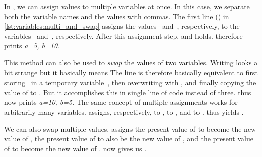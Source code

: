 %
%
%
%
In \python, we can assign values to multiple variables at once.
In this case, we separate both the variable names and the values with commas.
The first line (\pythonIdx{,}) in \cref{lst:variables:multi_and_swap} assigns the values~ and~, respectively, to the variables~ and~, respectively.
After this assignment step,  and  holds.
 therefore prints \textit{a=5, b=10}.

This method can also be used to \emph{swap} the values of two variables.
Writing  looks a bit strange but it basically means 
The line is therefore basically equivalent to first storing~ in a temporary variable~, then overwriting  with , and finally copying the value of  to .
But it accomplishes this in single line of code instead of three.
 thus now prints \textit{a=10, b=5}.%
%
%
%
The same concept of multiple assignments works for arbitrarily many variables.
 assigns, respectively,  to ,  to , and  to .
 thus yields .

We can also swap multiple values.
 assigns the present value of  to become the new value of , the present value of  to also be the new value of , and the present value of  to become the new value of .
 now gives us .
%
\FloatBarrier%
\endhsection%
%
